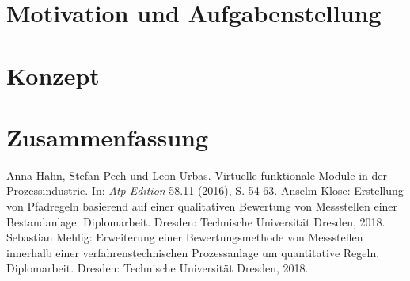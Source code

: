 \documentclass{ifaPoster}
\begin{document}
\section{Motivation und Aufgabenstellung}


\section{Konzept}


\section{Zusammenfassung}


 {\tiny\renewcommand{\section}[2]{}%
 	 \begin{thebibliography}{8.5}
		Anna Hahn, Stefan Pech und Leon Urbas. {\glqq Virtuelle funktionale Module in der Prozessindustrie\grqq}. {In: \textit{Atp Edition}} 58.11 (2016), S. 54-63.
		Anselm Klose: {\glqq Erstellung von Pfadregeln basierend auf einer qualitativen Bewertung von Messstellen einer Bestandanlage\grqq}. Diplomarbeit. Dresden: Technische Universität Dresden, 2018.
		Sebastian Mehlig: {\glqq Erweiterung einer Bewertungsmethode von Messstellen innerhalb einer verfahrenstechnischen Prozessanlage um quantitative Regeln\grqq}. Diplomarbeit. Dresden: Technische Universität Dresden, 2018.
	\end{thebibliography}}
	
\end{document}
